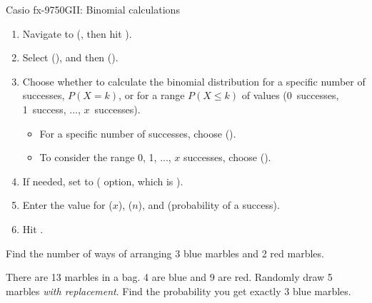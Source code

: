 \begin{onebox}{ Casio fx-9750GII: Binomial calculations}
\begin{enumerate}
\setlength{\itemsep}{0mm}
\item Navigate to  (, then hit ).
\item Select  (), and then  ().
\item Choose whether to calculate the binomial distribution for a specific number of successes, $P(X = k)$, or for a range $P(X \leq k)$ of values (0~successes, 1~success, ..., $x$~successes).\vspace{-1.5mm}
  \begin{itemize}
  \setlength{\itemsep}{0mm}
  \item For a specific number of successes, choose  (). %
  \item To consider the range 0, 1, ..., $x$ successes, choose (). %
  \end{itemize}
\item If needed, set  to  ( option, which is ).
\item Enter the value for  ($x$),  ($n$), and  (probability of a success).
\item Hit .
\end{enumerate}
\end{onebox}

\begin{exercisewrap}
\begin{nexercise}
Find the number of ways of arranging 3 blue marbles and 2 red marbles.\footnotemark
\end{nexercise}
\end{exercisewrap}
\vspace{-2mm}


\begin{exercisewrap}
\begin{nexercise}There are 13 marbles in a bag. 4 are blue and 9 are red. Randomly draw 5 marbles \emph{with replacement}. Find the probability you get exactly 3 blue marbles.\footnotemark
\end{nexercise}
\end{exercisewrap}
\vspace{-2mm}

